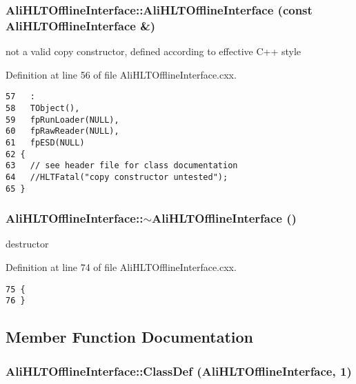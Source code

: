 \subsubsection{\setlength{\rightskip}{0pt plus 5cm}Ali\-HLTOffline\-Interface::Ali\-HLTOffline\-Interface (const {\bf Ali\-HLTOffline\-Interface} \&)}\label{classAliHLTOfflineInterface_a2}


not a valid copy constructor, defined according to effective C++ style 

Definition at line 56 of file Ali\-HLTOffline\-Interface.cxx.

\footnotesize\begin{verbatim}57   :
58   TObject(),
59   fpRunLoader(NULL),
60   fpRawReader(NULL),
61   fpESD(NULL)
62 {
63   // see header file for class documentation
64   //HLTFatal("copy constructor untested");
65 }

\end{verbatim}\normalsize 


\subsubsection{\setlength{\rightskip}{0pt plus 5cm}Ali\-HLTOffline\-Interface::$\sim${\bf Ali\-HLTOffline\-Interface} ()\hspace{0.3cm}{\tt  [virtual]}}\label{classAliHLTOfflineInterface_a4}


destructor 

Definition at line 74 of file Ali\-HLTOffline\-Interface.cxx.

\footnotesize\begin{verbatim}75 {
76 }
\end{verbatim}\normalsize 




\subsection{Member Function Documentation}
\subsubsection{\setlength{\rightskip}{0pt plus 5cm}Ali\-HLTOffline\-Interface::Class\-Def ({\bf Ali\-HLTOffline\-Interface}, 1)\hspace{0.3cm}{\tt  [private]}}\label{classAliHLTOfflineInterface_d0}


